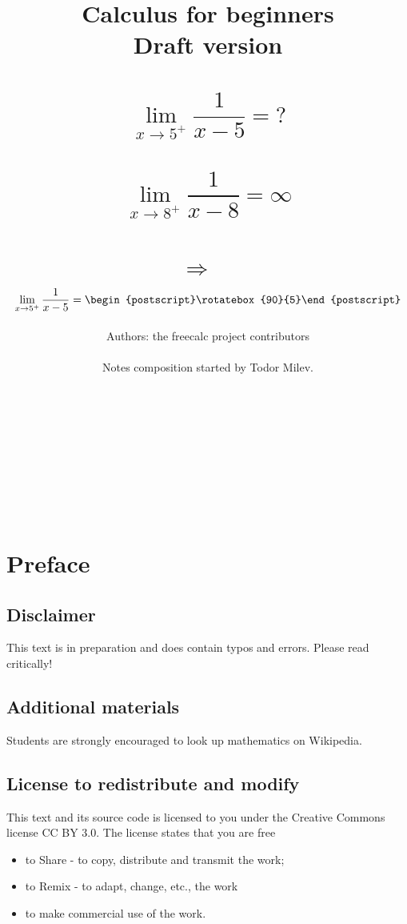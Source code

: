 \documentclass[12pt]{book}
\author{Authors: the freecalc project contributors \\~\\ Notes composition started by Todor Milev.}
\title{Calculus for beginners \\Draft version \\ ~\\
\[
\lim\limits_{x\to 5^+}\frac{1}{x-5}= ?
\]
~\\
\[
\lim\limits_{x\to 8^+}\frac{1}{x-8}=\infty 
\]
~\\
$\Rightarrow$
~\\
\[
\lim\limits_{x\to 5^+}\frac{1}{x-5}= \begin{postscript}\rotatebox{90}{5}\end{postscript}
\]
}
\begin{document}
\maketitle

{
~

\bigskip

~

\bigskip

~

\bigskip

~

\bigskip

\begin{center}
\Huge{\color{red}}
\end{center}
} %



\chapter*{Preface}


\section*{Disclaimer} 
This text is in preparation and does contain typos and errors. Please read critically!

\section*{Additional materials} Students are strongly encouraged to look up mathematics on Wikipedia. 


\section*{License to redistribute and modify} This text and its source code is licensed to you under the Creative Commons license CC BY 3.0. The license states that you are free
\begin{itemize}
\item to Share - to copy, distribute and transmit the work;
\item to Remix - to adapt, change, etc., the work
\item to make commercial use of the work.
\end{itemize}
\end{document}
